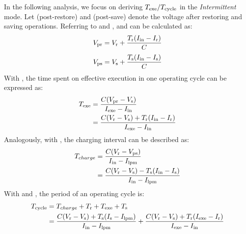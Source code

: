 In the following analysis, we focus on deriving $T_{\text{exe}} / T_{\text{cycle}}$ in the \textit{Intermittent} mode. 
Let  (post-restore) and  (post-save) denote the voltage after restoring and saving operations. 
Referring to  and ,  and  can be calculated as:
\begin{equation}
    V_{\text{pr}} = V_{\text{r}} + \frac{T_{\text{r}} (I_{\text{in}} - I_{\text{r}})}{C}
    \label{eq:vpr}
\end{equation}
\begin{equation}
    V_{\text{ps}} = V_{\text{s}} + \frac{T_{\text{s}} (I_{\text{in}} - I_{\text{s}})}{C}
    \label{eq:vps}
\end{equation}
With , the time spent on effective execution  in one operating cycle can be expressed as:
\begin{equation}
    \begin{aligned}
        T_{\text{exe}} & = \frac{C(V_{\text{pr}} - V_{\text{s}})}{I_{\text{exe}} - I_{\text{in}}} \\
        & = \frac{C(V_{\text{r}} - V_{\text{s}}) + T_{\text{r}} (I_{\text{in}} - I_{\text{r}})} {I_{\text{exe}} - I_{\text{in}}}
    \end{aligned}
    \label{eq:texe}
\end{equation}
Analogously, with , the charging interval can be described as:
\begin{equation}
    \begin{aligned}
        T_{charge} & = \frac{C(V_{\text{r}} - V_{\text{ps}})}{I_{\text{in}} - I_{\text{lpm}}} \\
        & = \frac{C(V_{\text{r}} - V_{\text{s}}) - T_{\text{s}} (I_{\text{in}} - I_{\text{s}})} {I_{\text{in}} - I_{\text{lpm}}}
    \end{aligned}
    \label{eq:tcharge}
\end{equation}
With  and , the period of an operating cycle is:
\begin{equation}
    \begin{aligned}
        T_{\text{cycle}} & = T_{charge} + T_{\text{r}} + T_{\text{exe}} + T_{\text{s}} \\
        & = \frac{C (V_{\text{r}} - V_{\text{s}}) + T_{\text{s}} (I_{\text{s}} - I_{\text{lpm}})}{I_{\text{in}} - I_{\text{lpm}}} + \frac{C (V_{\text{r}} - V_{\text{s}}) + T_{\text{r}} (I_{\text{exe}} - I_{\text{r}})}{I_{\text{exe}} - I_{\text{in}}}
    \end{aligned}
    \label{eq:tperiod}
\end{equation}

